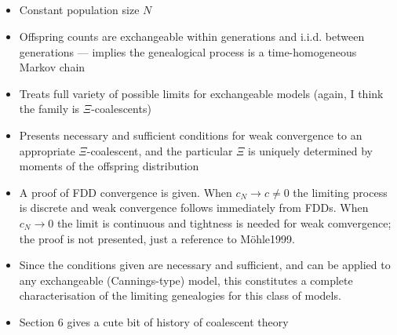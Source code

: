 \documentclass{article}
\begin{document}
\subsection*{\cite{mohle2001}}
\begin{itemize}
\item Constant population size $N$
\item Offspring counts are exchangeable within generations and i.i.d. between generations --- implies the genealogical process is a time-homogeneous Markov chain
\item Treats full variety of possible limits for exchangeable models (again, I think the family is $\Xi$-coalescents)
\item Presents necessary and sufficient conditions for weak convergence to an appropriate $\Xi$-coalescent, and the particular $\Xi$ is uniquely determined by moments of the offspring distribution
\item A proof of FDD convergence is given. When $c_N\to c\neq0$ the limiting process is discrete and weak convergence follows immediately from FDDs. When $c_N\to0$ the limit is continuous and tightness is needed for weak comvergence; the proof is not presented, just a reference to M\"ohle1999.
\item Since the conditions given are necessary and sufficient, and can be applied to any exchangeable (Cannings-type) model, this constitutes a complete characterisation of the limiting genealogies for this class of models.
\item Section 6 gives a cute bit of history of coalescent theory
\end{itemize}


\subsection*{\cite{mohle2002coal}}


\subsection*{\cite{mohle2003}}


\subsection*{\cite{schweinsberg2003}}
\end{document}
